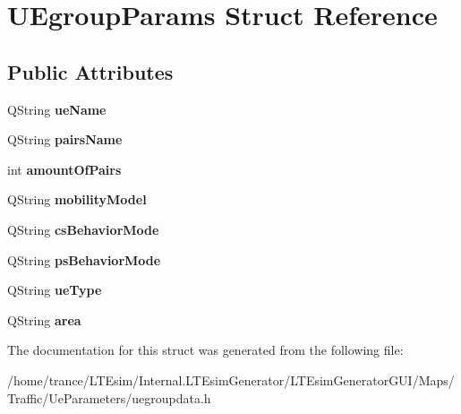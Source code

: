 \hypertarget{struct_u_egroup_params}{}\section{U\+Egroup\+Params Struct Reference}
\label{struct_u_egroup_params}
\subsection*{Public Attributes}
\begin{DoxyCompactItemize}
\item 
Q\+String {\bfseries ue\+Name}\hypertarget{struct_u_egroup_params_ad72a7c33e88843cba7ebda76f22825af}{}\label{struct_u_egroup_params_ad72a7c33e88843cba7ebda76f22825af}

\item 
Q\+String {\bfseries pairs\+Name}\hypertarget{struct_u_egroup_params_a076026422b42258f34df42bf4d998ad7}{}\label{struct_u_egroup_params_a076026422b42258f34df42bf4d998ad7}

\item 
int {\bfseries amount\+Of\+Pairs}\hypertarget{struct_u_egroup_params_a2db2f7542c34b21044e22bfe3a6af87d}{}\label{struct_u_egroup_params_a2db2f7542c34b21044e22bfe3a6af87d}

\item 
Q\+String {\bfseries mobility\+Model}\hypertarget{struct_u_egroup_params_aa5f368568e5135b47c33863528a91043}{}\label{struct_u_egroup_params_aa5f368568e5135b47c33863528a91043}

\item 
Q\+String {\bfseries cs\+Behavior\+Mode}\hypertarget{struct_u_egroup_params_a79c42f490357bc5f90b03176e0d6c5de}{}\label{struct_u_egroup_params_a79c42f490357bc5f90b03176e0d6c5de}

\item 
Q\+String {\bfseries ps\+Behavior\+Mode}\hypertarget{struct_u_egroup_params_a52fbdaa44172a16a4640fd0823003b57}{}\label{struct_u_egroup_params_a52fbdaa44172a16a4640fd0823003b57}

\item 
Q\+String {\bfseries ue\+Type}\hypertarget{struct_u_egroup_params_a04ae052ac8a79211201db18ef631c931}{}\label{struct_u_egroup_params_a04ae052ac8a79211201db18ef631c931}

\item 
Q\+String {\bfseries area}\hypertarget{struct_u_egroup_params_a41777450233171f1d9639ce54c98dbf2}{}\label{struct_u_egroup_params_a41777450233171f1d9639ce54c98dbf2}

\end{DoxyCompactItemize}


The documentation for this struct was generated from the following file\+:\begin{DoxyCompactItemize}
\item 
/home/trance/\+L\+T\+Esim/\+Internal.\+L\+T\+Esim\+Generator/\+L\+T\+Esim\+Generator\+G\+U\+I/\+Maps/\+Traffic/\+Ue\+Parameters/uegroupdata.\+h\end{DoxyCompactItemize}
